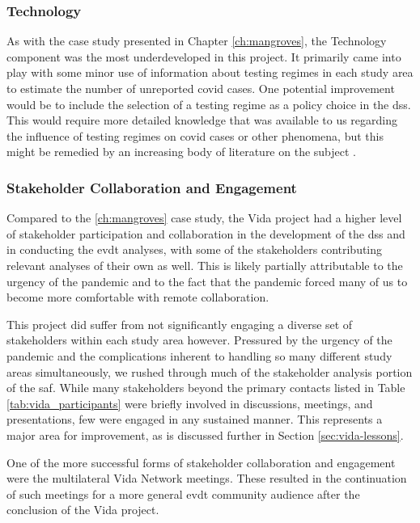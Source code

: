 \subsubsection{Technology}

As with the case study presented in Chapter \ref{ch:mangroves}, the Technology component was the most underdeveloped in this project. It primarily came into play with some minor use of information about testing regimes in each study area to estimate the number of unreported \ac{covid} cases. One potential improvement would be to include the selection of a testing regime as a policy choice in the \ac{dss}. This would require more detailed knowledge that was available to us regarding the influence of testing regimes on \ac{covid} cases or other phenomena, but this might be remedied by an increasing body of literature on the subject \cite{cordesSpatialAnalysisCOVID192020, souchCommentaryRuralUrban2021}.

\subsubsection{Stakeholder Collaboration and Engagement}

Compared to the \ref{ch:mangroves} case study, the Vida project had a higher level of stakeholder participation and collaboration in the development of the \ac{dss} and in conducting the \ac{evdt} analyses, with some of the stakeholders contributing relevant analyses of their own as well. This is likely partially attributable to the urgency of the pandemic and to the fact that the pandemic forced many of us to become more comfortable with remote collaboration. 

This project did suffer from not significantly engaging a diverse set of stakeholders within each study area however. Pressured by the urgency of the pandemic and the complications inherent to handling so many different study areas simultaneously, we rushed through much of the stakeholder analysis portion of the \ac{saf}. While many stakeholders beyond the primary contacts listed in Table \ref{tab:vida_participants} were briefly involved in discussions, meetings, and presentations, few were engaged in any sustained manner. This represents a major area for improvement, as is discussed further in Section \ref{sec:vida-lessons}.

One of the more successful forms of stakeholder collaboration and engagement were the multilateral Vida Network meetings. These resulted in the continuation of such meetings for a more general \ac{evdt} community audience after the conclusion of the Vida project.

